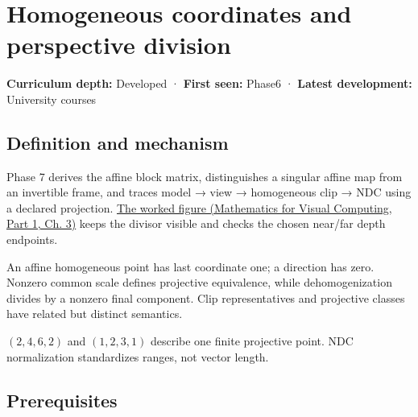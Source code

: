 \hypertarget{appendix-cb3b26862282}{}\label{referencestart:appendix-cb3b26862282}
\section{Homogeneous coordinates and perspective division}\label{appendix-cb3b26862282-homogeneous-coordinates-and-perspective-division}

\hypertarget{appendix-cb3b26862282-homogeneous-coordinates-and-perspective-division}{}

\textbf{Curriculum depth:} Developed · \textbf{First seen:} Phase6 · \textbf{Latest development:} University courses

\begin{allmightroledefinition}

\subsection{Definition and mechanism}\label{appendix-cb3b26862282-definition-and-mechanism}

\hypertarget{appendix-cb3b26862282-definition-and-mechanism}{}

Phase 7 derives the affine block matrix, distinguishes a singular affine map from an invertible frame, and traces model → view → homogeneous clip → NDC using a declared projection. \href{../02-Mathematics-for-Visual-Computing-P01/main.pdf\#nameddest=01-foundations-i-ch019-figure-m6---follow-one-point-through-named-spaces}{The worked figure (Mathematics for Visual Computing, Part 1, Ch. 3)} keeps the divisor visible and checks the chosen near/far depth endpoints.

\end{allmightroledefinition}

An affine homogeneous point has last coordinate one; a direction has zero. Nonzero common scale defines projective equivalence, while dehomogenization divides by a nonzero final component. Clip representatives and projective classes have related but distinct semantics.

\((2,4,6,2)\) and \((1,2,3,1)\) describe one finite projective point. NDC normalization standardizes ranges, not vector length.

\subsection{Prerequisites}\label{appendix-cb3b26862282-prerequisites}

\hypertarget{appendix-cb3b26862282-prerequisites}{}

